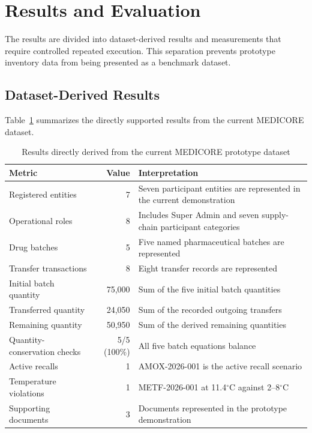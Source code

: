 \documentclass[11pt,a4paper]{article}
\begin{document}
\section{Results and Evaluation}
The results are divided into dataset-derived results and measurements that require controlled repeated execution. This separation prevents prototype inventory data from being presented as a benchmark dataset.

\subsection{Dataset-Derived Results}
Table~\ref{tab:dataset_results} summarizes the directly supported results from the current MEDICORE dataset.

\begin{table}[htbp]
\centering
\caption{Results directly derived from the current MEDICORE prototype dataset}
\label{tab:dataset_results}
\vspace{0.5em}
\begin{tabularx}{\textwidth}{lrX}
\toprule
\textbf{Metric} & \textbf{Value} & \textbf{Interpretation} \\
\midrule
Registered entities & 7 & Seven participant entities are represented in the current demonstration \\
Operational roles & 8 & Includes Super Admin and seven supply-chain participant categories \\
Drug batches & 5 & Five named pharmaceutical batches are represented \\
Transfer transactions & 8 & Eight transfer records are represented \\
Initial batch quantity & 75,000 & Sum of the five initial batch quantities \\
Transferred quantity & 24,050 & Sum of the recorded outgoing transfers \\
Remaining quantity & 50,950 & Sum of the derived remaining quantities \\
Quantity-conservation checks & 5/5 (100\%) & All five batch equations balance \\
Active recalls & 1 & AMOX-2026-001 is the active recall scenario \\
Temperature violations & 1 & METF-2026-001 at 11.4$^\circ$C against 2--8$^\circ$C \\
Supporting documents & 3 & Documents represented in the prototype demonstration \\
\bottomrule
\end{tabularx}
\end{table}
\end{document}
